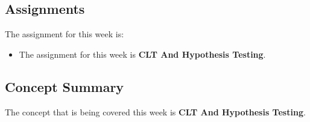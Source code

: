 \subsection{Assignments}

The assignment for this week is:

\begin{itemize}
    \item The assignment for this week is \textbf{CLT And Hypothesis Testing}. 
\end{itemize}

\subsection{Concept Summary}

The concept that is being covered this week is \textbf{CLT And Hypothesis Testing}.

